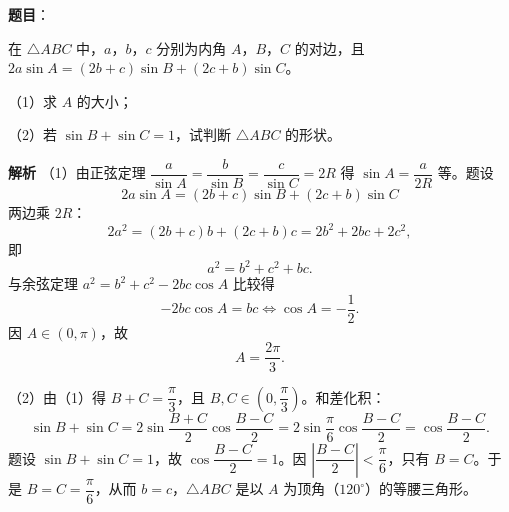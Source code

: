 \begin{answer}

\textbf{题目}：

在 $\triangle ABC$ 中，$a$，$b$，$c$ 分别为内角 $A$，$B$，$C$ 的对边，且 $2a\sin A=(2b+c)\sin B+(2c+b)\sin C$。

（1）求 $A$ 的大小；

（2）若 $\sin B+\sin C=1$，试判断 $\triangle ABC$ 的形状。

\textbf{解析}
（1）由正弦定理 $\dfrac{a}{\sin A}=\dfrac{b}{\sin B}=\dfrac{c}{\sin C}=2R$ 得 $\sin A=\dfrac{a}{2R}$ 等。题设
\nopagebreak[4]
\[2a\sin A=(2b+c)\sin B+(2c+b)\sin C\]
两边乘 $2R$：
\nopagebreak[4]
\[2a^2=(2b+c)b+(2c+b)c=2b^2+2bc+2c^2,\]
即
\nopagebreak[4]
\[a^2=b^2+c^2+bc.\]
与余弦定理 $a^2=b^2+c^2-2bc\cos A$ 比较得
\nopagebreak[4]
\[-2bc\cos A=bc\iff\cos A=-\frac12.\]
因 $A\in(0,\pi)$，故
\nopagebreak[4]
\[A=\frac{2\pi}{3}.\]

（2）由（1）得 $B+C=\dfrac{\pi}{3}$，且 $B,C\in\left(0,\dfrac\pi3\right)$。和差化积：
\nopagebreak[4]
\[\sin B+\sin C=2\sin\frac{B+C}{2}\cos\frac{B-C}{2}
=2\sin\frac{\pi}{6}\cos\frac{B-C}{2}=\cos\frac{B-C}{2}.\]
题设 $\sin B+\sin C=1$，故 $\cos\dfrac{B-C}{2}=1$。因 $\left|\dfrac{B-C}{2}\right|<\dfrac{\pi}{6}$，只有 $B=C$。于是 $B=C=\dfrac{\pi}{6}$，从而 $b=c$，$\triangle ABC$ 是以 $A$ 为顶角（$120^\circ$）的等腰三角形。


\end{answer}
